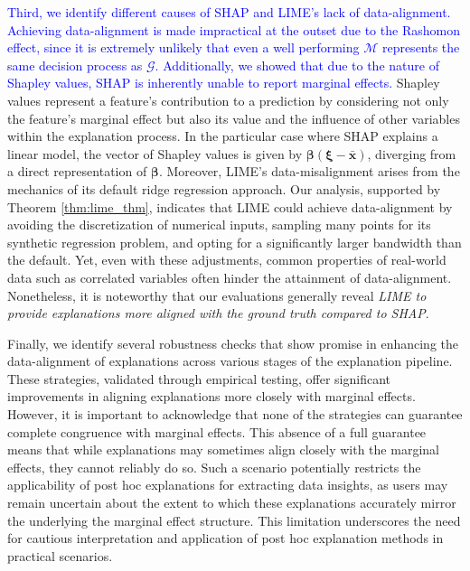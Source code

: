 \documentclass[mnsc,blindrev]{informs3}
\begin{document}
        \textcolor{blue}{Third, we identify different causes of SHAP and LIME's lack of data-alignment. Achieving data-alignment is made impractical at the outset due to the Rashomon effect, since it is extremely unlikely that even a well performing $\mathcal{M}$ represents the same decision process as $\mathcal{G}$. Additionally, we showed that due to the nature of Shapley values, SHAP is inherently unable to report marginal effects.} Shapley values represent a feature's contribution to a prediction by considering not only the feature's marginal effect but also its value and the influence of other variables within the explanation process. In the particular case where SHAP explains a linear model, the vector of Shapley values is given by $\boldsymbol{\beta}(\boldsymbol{\xi}-\bar{\mathbf{x}})$, diverging from a direct representation of $\boldsymbol{\beta}$. Moreover, LIME's data-misalignment arises from the mechanics of its default ridge regression approach. Our analysis, supported by Theorem \ref{thm:lime_thm}, indicates that LIME could achieve data-alignment by avoiding the discretization of numerical inputs, sampling many points for its synthetic regression problem, and opting for a significantly larger bandwidth than the default. Yet, even with these adjustments, common properties of real-world data such as correlated variables often hinder the attainment of data-alignment. Nonetheless, it is noteworthy that our evaluations generally reveal \textit{LIME to provide explanations more aligned with the ground truth compared to SHAP}.
 
        
         Finally, we identify several robustness checks that show promise in enhancing the data-alignment of explanations across various stages of the explanation pipeline. These strategies, validated through empirical testing, offer significant improvements in aligning explanations more closely with marginal effects. However, it is important to acknowledge that none of the strategies can guarantee complete congruence with marginal effects. This absence of a full guarantee means that while explanations may sometimes align closely with the marginal effects, they cannot reliably do so. Such a scenario potentially restricts the applicability of post hoc explanations for extracting data insights, as users may remain uncertain about the extent to which these explanations accurately mirror the underlying the marginal effect structure. This limitation underscores the need for cautious interpretation and application of post hoc explanation methods in practical scenarios.
        
\end{document}
